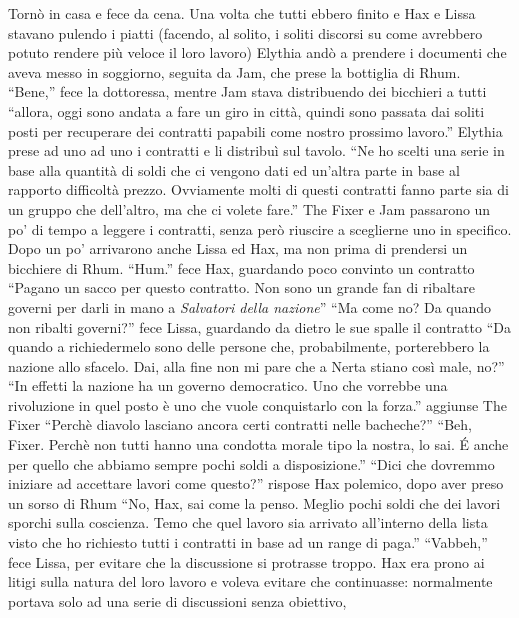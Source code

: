     Tornò in casa e fece da cena. Una volta che tutti ebbero finito e Hax e
    Lissa stavano pulendo i piatti (facendo, al solito, i soliti discorsi
    su come avrebbero potuto rendere più veloce il loro lavoro) Elythia
    andò a prendere i documenti che aveva messo in soggiorno, seguita da
    Jam, che prese la bottiglia di Rhum. ``Bene,'' fece la dottoressa,
    mentre Jam stava distribuendo dei bicchieri a tutti ``allora, oggi sono
    andata a fare un giro in città, quindi sono passata dai soliti posti
    per recuperare dei contratti papabili come nostro prossimo lavoro.''
    Elythia prese ad uno ad uno i contratti e li distribuì sul tavolo.
    ``Ne ho scelti una serie in base alla quantità di soldi che ci vengono
    dati ed un'altra parte in base al rapporto difficoltà prezzo.
    Ovviamente molti di questi contratti fanno parte sia di un gruppo che
    dell'altro, ma che ci volete fare.'' The Fixer e Jam passarono un po'
    di tempo a leggere i contratti, senza però riuscire a sceglierne uno in
    specifico. Dopo un po' arrivarono anche Lissa ed Hax, ma non prima di
    prendersi un bicchiere di Rhum. ``Hum.'' fece Hax, guardando poco
    convinto un contratto ``Pagano un sacco per questo contratto. Non sono
    un grande fan di ribaltare governi per darli in mano a \emph{Salvatori
    della nazione}'' ``Ma come no? Da quando non ribalti governi?'' fece
    Lissa, guardando da dietro le sue spalle il contratto ``Da quando a
    richiedermelo sono delle persone che, probabilmente, porterebbero la
    nazione allo sfacelo. Dai, alla fine non mi pare che a Nerta stiano
    così male, no?'' ``In effetti la nazione ha un governo democratico. Uno
    che vorrebbe una rivoluzione in quel posto è uno che vuole conquistarlo
    con la forza.'' aggiunse The Fixer ``Perchè diavolo lasciano ancora
    certi contratti nelle bacheche?'' ``Beh, Fixer. Perchè non tutti hanno
    una condotta morale tipo la nostra, lo sai. \'E anche per quello che
    abbiamo sempre pochi soldi a disposizione.'' ``Dici che dovremmo
    iniziare ad accettare lavori come questo?'' rispose Hax polemico, dopo
    aver preso un sorso di Rhum ``No, Hax, sai come la penso. Meglio pochi
    soldi che dei lavori sporchi sulla coscienza. Temo che quel lavoro sia
    arrivato all'interno della lista visto che ho richiesto tutti i
    contratti in base ad un range di paga.'' ``Vabbeh,'' fece Lissa, per
    evitare che la discussione si protrasse troppo. Hax era prono ai litigi
    sulla natura del loro lavoro e voleva evitare che continuasse:
    normalmente portava solo ad una serie di discussioni senza obiettivo,
